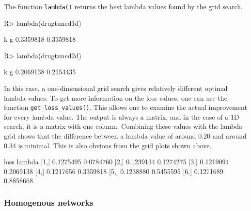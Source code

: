 \documentclass[
]{article}
\begin{document}
The function \texttt{lambda()} returns the best lambda values found by
the grid search.

\begin{CodeChunk}

\begin{CodeInput}
R> lambda(drugtuned1d)
\end{CodeInput}

\begin{CodeOutput}
        k         g 
0.3359818 0.3359818 
\end{CodeOutput}

\begin{CodeInput}
R> lambda(drugtuned2d)
\end{CodeInput}

\begin{CodeOutput}
        k         g 
0.2069138 0.2154435 
\end{CodeOutput}
\end{CodeChunk}

In this case, a one-dimensional grid search gives relatively different
optimal lambda values. To get more information on the loss values, one
can use the function \texttt{get\_loss\_values()}. This allows one to
examine the actual improvement for every lambda value. The output is
always a matrix, and in the case of a 1D search, it is a matrix with one
column. Combining these values with the lambda grid shows that the
difference between a lambda value of around 0.20 and around 0.34 is
minimal. This is also obvious from the grid plots shown above.

\begin{CodeChunk}


\begin{CodeOutput}
          loss    lambda
[1,] 0.1275495 0.0784760
[2,] 0.1239134 0.1274275
[3,] 0.1219094 0.2069138
[4,] 0.1217656 0.3359818
[5,] 0.1238880 0.5455595
[6,] 0.1271689 0.8858668
\end{CodeOutput}
\end{CodeChunk}

\hypertarget{homogenous-networks}{%
\subsubsection{Homogenous networks}\label{homogenous-networks}}
\end{document}

